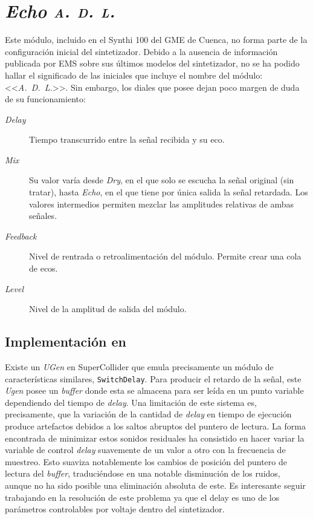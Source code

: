 \section{\textit{Echo \textsc{a. d. l.}}}


Este módulo, incluido en el Synthi 100 del GME de Cuenca, no forma parte de la configuración inicial del sintetizador. Debido a la ausencia de información publicada por EMS sobre sus últimos modelos del sintetizador, no se ha podido hallar el significado de las iniciales que incluye el nombre del módulo: <<\textit{A.~D.~L.}>>. Sin embargo, los diales que posee dejan poco margen de duda de su funcionamiento:

\begin{description}
	\item[\textit{Delay}] Tiempo transcurrido entre la señal recibida y su eco.
	\item[\textit{Mix}] Su valor varía desde \textit{Dry}, en el que solo se escucha la señal original (sin tratar), hasta \textit{Echo}, en el que tiene por única salida la señal retardada. Los valores intermedios permiten mezclar las amplitudes relativas de ambas señales.
	\item[\textit{Feedback}] Nivel de rentrada o retroalimentación del módulo. Permite crear una cola de ecos. 
	\item[\textit{Level}] Nivel de la amplitud de salida del módulo.
\end{description}

\subsection{Implementación en \appName}

Existe un \textit{UGen} en SuperCollider que emula precisamente un módulo de características similares, \texttt{SwitchDelay}. Para producir el retardo de la señal, este \textit{Ugen} posee un \textit{buffer} donde esta se almacena para ser leída en un punto variable dependiendo del tiempo de \textit{delay}. Una limitación de este sistema es, precisamente, que la variación de la cantidad de \textit{delay} en tiempo de ejecución produce artefactos debidos a los saltos abruptos del puntero de lectura. La forma encontrada de minimizar estos sonidos residuales ha consistido en hacer variar la variable de control \textit{delay} suavemente de un valor a otro con la frecuencia de muestreo. Esto suaviza notablemente los cambios de posición del puntero de lectura del \textit{buffer}, traduciéndose en una notable disminución de los ruidos, aunque no ha sido posible una eliminación absoluta de este. Es interesante seguir trabajando en la resolución de este problema ya que el delay es uno de los parámetros controlables por voltaje dentro del sintetizador.


